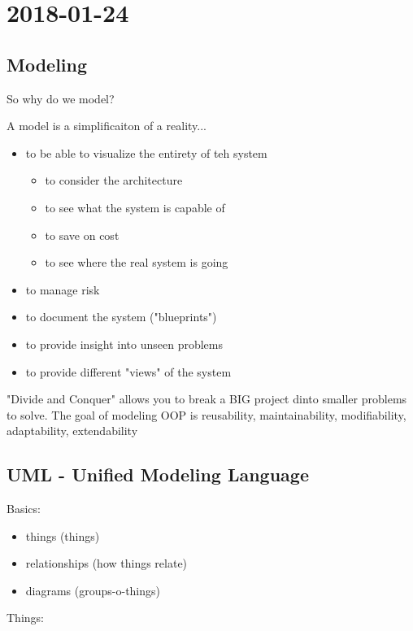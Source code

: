 \section{2018-01-24}

\subsection{Modeling}

So why do we model?

A model is a simplificaiton of a reality...

\begin{itemize}
  \item to be able to visualize the entirety of teh system
  \begin{itemize}
    \item to consider the architecture
    \item to see what the system is capable of 
    \item to save on cost
    \item to see where the real system is going
  \end{itemize}
  \item to manage risk
  \item to document the system ("blueprints")
  \item to provide insight into unseen problems
  \item to provide different "views" of the system
\end{itemize}

"Divide and Conquer" allows you to break a BIG project dinto smaller problems to solve. The goal of modeling OOP is reusability, maintainability, modifiability, adaptability, extendability

\subsection{UML - Unified Modeling Language}

Basics:

\begin{itemize}
  \item things (things)
  \item relationships (how things relate)
  \item diagrams (groups-o-things)
\end{itemize}

Things:

